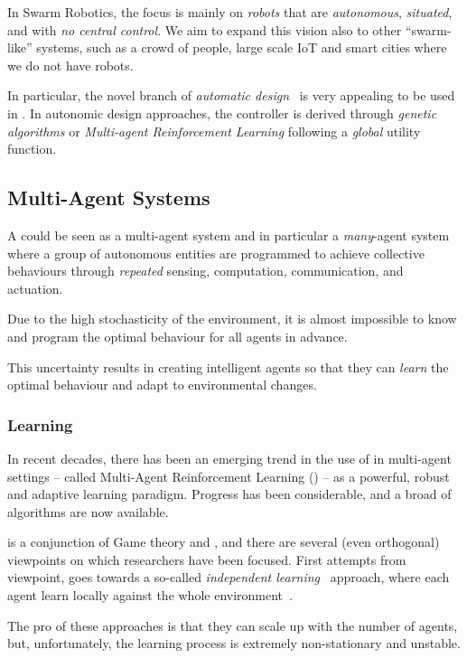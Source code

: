 \documentclass[11pt]{article}
\begin{document}
In Swarm Robotics, the focus is mainly on \textit{robots} that are \emph{autonomous}, \emph{situated}, and with \emph{no central control}. We aim to expand this vision also to other ``swarm-like'' systems, such as a crowd of people, large scale IoT and smart cities where we do not have robots. 

In particular, the novel branch of \textit{automatic design}~\cite{DBLP:journals/firai/FrancescaB16} is very appealing to be used in \cpsw{}. In autonomic design approaches, the controller is derived through \textit{genetic algorithms} or \textit{Multi-agent Reinforcement Learning} following a \textit{global} utility function. 
\subsection{Multi-Agent Systems}
A \cpsw{} could be seen as a multi-agent system and in particular a \emph{many}-agent system where a group of autonomous entities are programmed to achieve collective behaviours through \emph{repeated} sensing, computation, communication, and actuation.

Due to the high stochasticity of the environment, it is almost impossible to know and program the optimal behaviour for all agents in advance.

This uncertainty results in creating intelligent agents so that they can \emph{learn} the optimal behaviour and adapt to environmental changes.
\subsubsection{Learning}
In recent decades, there has been an emerging trend in the use of \rl{} 
in multi-agent settings -- called Multi-Agent Reinforcement Learning (\marl{}) -- as a powerful, robust and adaptive learning paradigm.
%
Progress has been considerable, and a broad of algorithms are now available.

\marl{} is a conjunction of Game theory and \rl{}, 
 and there are several (even orthogonal) viewpoints on which researchers have been focused.
First attempts from \rl{} viewpoint, 
 goes towards a so-called \textit{independent learning}~\cite{DBLP:journals/tsmc/BusoniuBS08} approach, where each agent learn locally against the whole environment~\cite{DBLP:conf/icml/Tan93}.

The pro of these approaches is that they can scale up with the number of agents, 
 but, unfortunately, the learning process is extremely non-stationary and unstable.
% 
\end{document}
